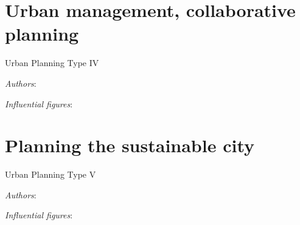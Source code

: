 \documentclass{article}
\newcommand{\bisection}[1]{\textbf{\textit{#1}}}
\begin{document}
\bisection{}

\bisection{}

\bisection{}

\bisection{}

\bisection{}

\bisection{}



\pagebreak
\section{Urban management, collaborative planning}

Urban Planning Type IV

\textit{Authors}:

\textit{Influential figures}:


\bisection{}

\bisection{}

\bisection{}

\bisection{}

\bisection{}

\bisection{}

\bisection{}

\bisection{}

\bisection{}

\bisection{}

\bisection{}


\pagebreak
\section{Planning the sustainable city}

Urban Planning Type V

\textit{Authors}:

\textit{Influential figures}:


\bisection{}

\bisection{}

\bisection{}

\bisection{}

\bisection{}

\bisection{}

\bisection{}

\bisection{}

\bisection{}

\bisection{}

\bisection{}


\printbibliography
\end{document}
